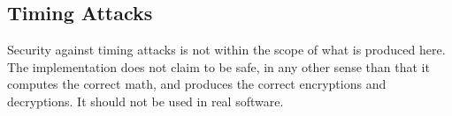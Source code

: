 \subsection{Timing Attacks}

Security against timing attacks is not within the scope of what is produced here. The implementation
does not claim to be safe, in any other sense than that it computes the correct math, and produces
the correct encryptions and decryptions. It should not be used in real software.